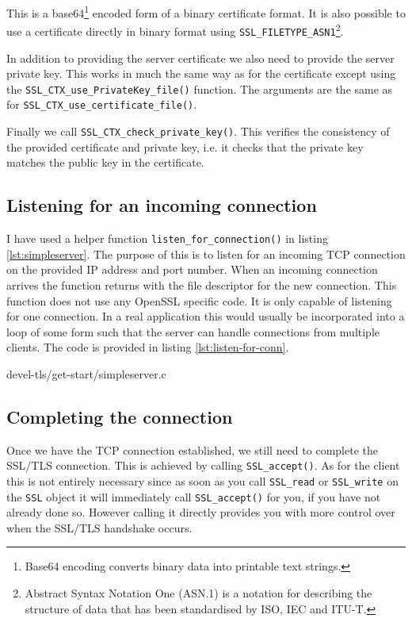 This is a base64\footnote{Base64 encoding converts binary data into printable 
text strings.} encoded form of a binary certificate format. It is also 
possible to use a certificate directly in binary format using 
\verb!SSL_FILETYPE_ASN1!\footnote{Abstract Syntax Notation One (ASN.1) is a 
notation for describing the structure of data that has been standardised by 
ISO, IEC and ITU-T.}.

In addition to providing the server certificate we also need to provide the 
server private key. This works in much the same way as for the certificate 
except using the \verb!SSL_CTX_use_PrivateKey_file()! function. The arguments 
are the same as for \verb!SSL_CTX_use_certificate_file()!.

Finally we call \verb!SSL_CTX_check_private_key()!. This verifies the 
consistency of the provided certificate and private key, i.e. it checks that 
the private key matches the public key in the certificate.

\subsection{Listening for an incoming connection}

I have used a helper function \verb!listen_for_connection()! in listing 
\ref{lst:simpleserver}. The purpose of this is to listen for an incoming TCP 
connection on the provided IP address and port number. When an incoming 
connection arrives the function returns with the file descriptor for the new 
connection. This function does not use any OpenSSL specific code. It is only 
capable of listening for one connection. In a real application this would 
usually be incorporated into a loop of some form such that the server can 
handle connections from multiple clients. The code is provided in listing 
\ref{lst:listen-for-conn}.


{devel-tls/get-start/simpleserver.c}

\subsection{Completing the connection}

Once we have the TCP connection established, we still need to complete the 
SSL/TLS connection. This is achieved by calling \verb!SSL_accept()!. As for the 
client this is not entirely necessary since as soon as you call \verb!SSL_read! 
or \verb!SSL_write! on the \verb!SSL! object it will immediately call 
\verb!SSL_accept()! for you, if you have not already done so. However calling 
it directly provides you with more control over when the SSL/TLS handshake 
occurs.

